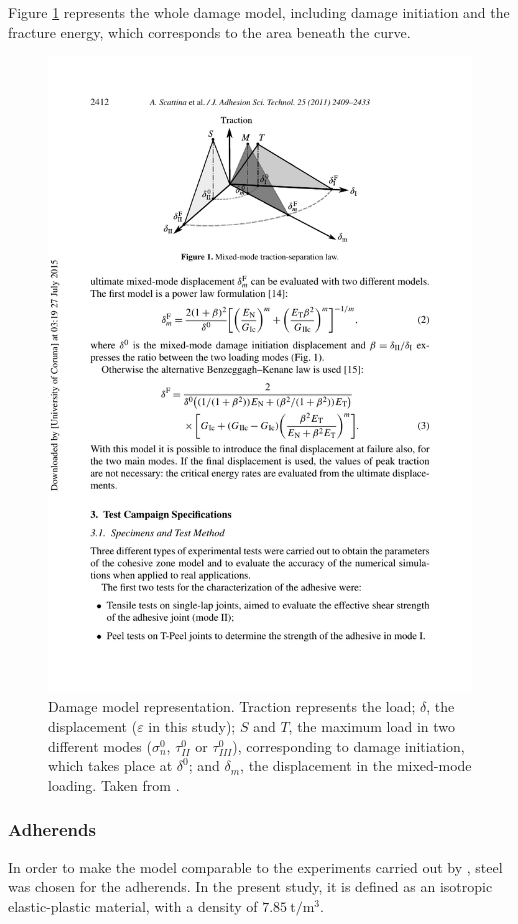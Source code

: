 \documentclass[cmfonts]{witpress}
\begin{document}
Figure \ref{fig:damage} represents the whole damage model, including damage initiation and the fracture energy, which corresponds to the area beneath the curve.

\begin{figure}
	\centering
	\includegraphics[width=0.7\linewidth]{figures/IMG_CUTRES/scattina_quads}
	\caption[Damage model representation.]{Damage model representation. Traction represents the load; $\delta$, the displacement ($\varepsilon$ in this study); $S$ and $T$, the maximum load in two different modes ($\sigma_{n}^{0}$, $\tau_{II}^{0}$ or $\tau_{III}^{0}$), corresponding to damage initiation, which takes place at $\delta^0$; and $\delta_m$, the displacement in the mixed-mode loading. Taken from \cite{Scattina2011}.}
	\label{fig:damage}
\end{figure}

\subsubsection{Adherends}

In order to make the model comparable to the experiments carried out by \cite{Peroni2009}, steel was chosen for the adherends. In the present study, it is defined as an isotropic elastic-plastic material, with a density of $\SI{7.85}{\tonne/\m^3}$.
\end{document}
